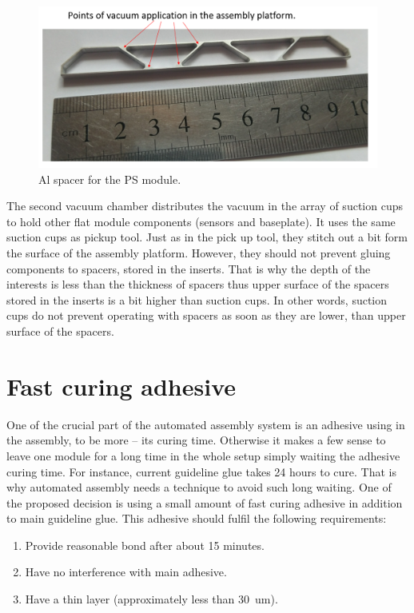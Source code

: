 \begin{figure}[ht]\centering
\includegraphics[width=0.7\linewidth]{Data/Module_assembly/Al_spacer.png}
\caption{Al spacer for the PS module.}
\label{fig:al_spacer}
\end{figure}

The second vacuum chamber distributes the vacuum in the array of suction cups to hold other flat module components (sensors and baseplate). It uses the same suction cups as pickup tool. Just as in the pick up tool, they stitch out a bit form the surface of the assembly platform. However, they should not prevent gluing components to spacers, stored in the inserts. That is why the depth of the interests is less than the thickness of spacers thus upper surface of the spacers stored in the inserts is a bit higher than suction cups. In other words, suction cups do not prevent operating with spacers as soon as they are lower, than upper surface of the spacers.

\section{Fast curing adhesive}

One of the crucial part of the automated assembly system is an adhesive using in the assembly, to be more  -- its curing time. Otherwise it makes a few sense to leave one module for a long time in the whole setup simply waiting the adhesive curing time. For instance, current guideline glue takes 24 hours to cure. That is why automated assembly needs a technique to avoid such long waiting. One of the proposed decision is using a small amount of fast curing adhesive in addition to main guideline glue. This adhesive should fulfil the following requirements:

\begin{enumerate}
\setlength\itemsep{-0.5em}
\item Provide reasonable bond after about 15 minutes.
\item Have no interference with main adhesive.
\item Have a thin layer (approximately less than 30~um).
\end{enumerate}

